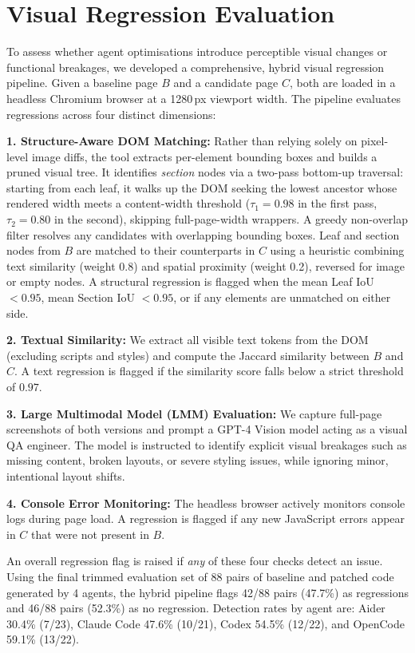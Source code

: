 \section{Visual Regression Evaluation}

To assess whether agent optimisations introduce perceptible visual changes or functional breakages, we developed a comprehensive, hybrid visual regression pipeline. Given a baseline page $B$ and a candidate page $C$, both are loaded in a headless Chromium browser at a 1280\,px viewport width. The pipeline evaluates regressions across four distinct dimensions:

\textbf{1. Structure-Aware DOM Matching:} Rather than relying solely on pixel-level image diffs, the tool extracts per-element bounding boxes and builds a pruned visual tree. It identifies \emph{section} nodes via a two-pass bottom-up traversal: starting from each leaf, it walks up the DOM seeking the lowest ancestor whose rendered width meets a content-width threshold ($\tau_1 = 0.98$ in the first pass, $\tau_2 = 0.80$ in the second), skipping full-page-width wrappers. A greedy non-overlap filter resolves any candidates with overlapping bounding boxes. Leaf and section nodes from $B$ are matched to their counterparts in $C$ using a heuristic combining text similarity (weight 0.8) and spatial proximity (weight 0.2), reversed for image or empty nodes. A structural regression is flagged when the mean Leaf IoU $< 0.95$, mean Section IoU $< 0.95$, or if any elements are unmatched on either side.

\textbf{2. Textual Similarity:} We extract all visible text tokens from the DOM (excluding scripts and styles) and compute the Jaccard similarity between $B$ and $C$. A text regression is flagged if the similarity score falls below a strict threshold of $0.97$.

\textbf{3. Large Multimodal Model (LMM) Evaluation:} We capture full-page screenshots of both versions and prompt a GPT-4 Vision model acting as a visual QA engineer. The model is instructed to identify explicit visual breakages such as missing content, broken layouts, or severe styling issues, while ignoring minor, intentional layout shifts.

\textbf{4. Console Error Monitoring:} The headless browser actively monitors console logs during page load. A regression is flagged if any new JavaScript errors appear in $C$ that were not present in $B$.

An overall regression flag is raised if \emph{any} of these four checks detect an issue. Using the final trimmed evaluation set of 88 pairs of baseline and patched code generated by 4 agents, the hybrid pipeline flags 42/88 pairs (47.7\%) as regressions and 46/88 pairs (52.3\%) as no regression. Detection rates by agent are: Aider 30.4\% (7/23), Claude Code 47.6\% (10/21), Codex 54.5\% (12/22), and OpenCode 59.1\% (13/22).

